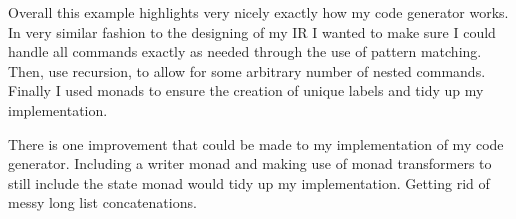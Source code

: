 Overall this example highlights very nicely exactly how my code generator works. In very similar fashion to the designing of my IR I wanted to make sure I could handle all commands exactly as needed through the use of pattern matching. Then, use recursion, to allow for some arbitrary number of nested commands. Finally I used monads to ensure the creation of unique labels and tidy up my implementation.

There is one improvement that could be made to my implementation of my code generator. Including a writer monad and making use of monad transformers to still include the state monad would tidy up my implementation. Getting rid of messy long list concatenations.  


